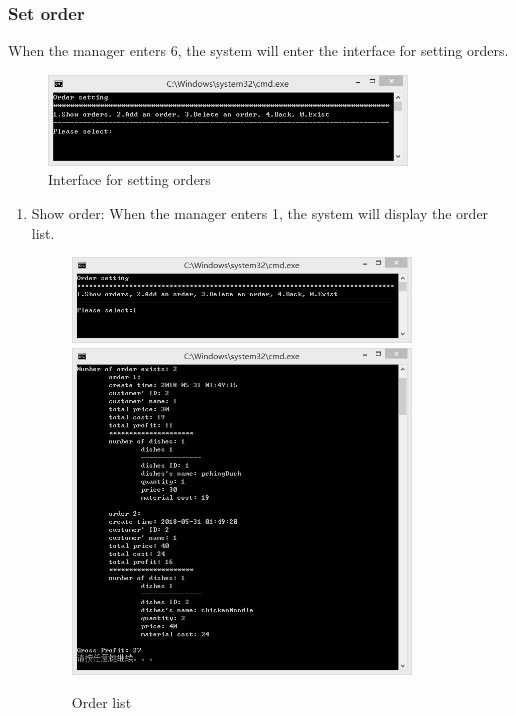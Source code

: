 \documentclass{article}
\begin{document}
\subsubsection{Set order}
When the manager enters 6, the system will enter the interface for setting orders.
\begin{figure}[H]
    \centering
    \includegraphics[width=0.85\textwidth]{F/02.jpg}
    \caption{Interface for setting orders}
\end{figure}

\begin{enumerate}
    \item Show order:\newline 
    When the manager enters 1, the system will display the order list.
        \begin{figure}[H]
        \centering
        \includegraphics[width=0.85\textwidth]{F/F1a.jpg}
        \includegraphics[width=0.85\textwidth]{F/F1b.jpg}
        \caption{Order list}
        \end{figure}
    

\end{enumerate}
\end{document}
